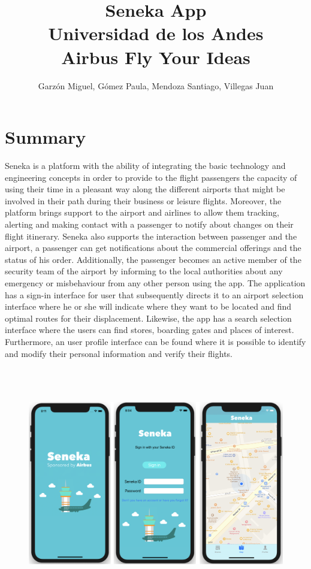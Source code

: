\documentclass[12pt]{article}
\begin{document}
\title{Seneka App\\
Universidad de los Andes\\
Airbus Fly Your Ideas}
\author{Garzón Miguel, Gómez Paula, Mendoza Santiago, Villegas Juan}
\maketitle


\section{Summary}

Seneka is a platform with the ability of integrating the basic technology and engineering concepts in order to provide to the flight passengers the capacity of using their time in a pleasant way along the different airports that might be involved in their path during their business or leisure flights. Moreover, the platform brings support to the airport and airlines to allow them tracking, alerting and making contact with a passenger to notify about changes on their flight itinerary. Seneka also supports the interaction between passenger and the airport, a passenger can get notifications about the commercial offerings and the status of his order. Additionally, the passenger becomes an active member of the security team of the airport by informing to the local authorities about any emergency or misbehaviour from any other person using the app. The application has a sign-in interface for user that subsequently directs it to an airport selection interface where he or she will indicate where they want to be located and find optimal routes for their displacement. Likewise, the app has a search selection interface where the users can find stores, boarding gates and places of interest. Furthermore, an user profile interface can be found where it is possible to identify and modify their personal information and verify their flights.\\


\begin{figure}[H]
\centering
\includegraphics[height=4.0in]{Figura_1.jpg}
\end{figure}
\end{document}
